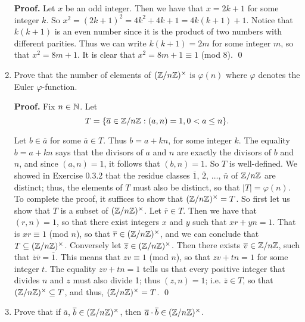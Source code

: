 \begin{enumerate}
      \textbf{Proof.} Let $x$ be an odd integer. Then we have that $x = 2k + 1$
      for some integer $k$. So $x^2 = (2k + 1)^2 = 4k^2 + 4k + 1 =
      4k(k + 1) + 1$. Notice that $k(k + 1)$ is an even number since it is the
      product of two numbers with different parities. Thus we can write
      $k(k + 1) = 2m$ for some integer $m$, so that $x^2 = 8m + 1$. It is clear
      that $x^2 = 8m + 1 \equiv 1$ (mod 8). \qed
   \item[0.3.10]  Prove that the number of elements of $(\mathbb{Z}/n\mathbb{Z})^\times$ is
                  $\varphi(n)$ where $\varphi$ denotes the Euler
                  $\varphi$-function.
                  
      \textbf{Proof.} Fix $n \in \mathbb{N}$. Let
      $$T = \{\overline{a} \in \mathbb{Z}/n\mathbb{Z} : (a, n) = 1, 0 < a \le n\}.$$

      Let $b \in \overline{a}$ for some $\overline{a} \in T$. Thus $b = a + kn$,
      for some integer $k$. The equality $b = a + kn$ says that the divisors of
      $a$ and $n$ are exactly the divisors of $b$ and $n$, and since
      $(a, n) = 1$, it follows that $(b, n) = 1$. So $T$ is well-defined. We
      showed in Exercise 0.3.2 that the residue classes $\overline{1}$,
      $\overline{2}$, $\ldots$, $\overline{n}$ of $\mathbb{Z}/n\mathbb{Z}$ are distinct; thus, 
      the elements of $T$ must also be distinct, so that $|T| = \varphi(n)$. To
      complete the proof, it suffices to show that $(\mathbb{Z}/n\mathbb{Z})^\times = T$. So
      first let us show that $T$ is a subset of $(\mathbb{Z}/n\mathbb{Z})^\times$. Let
      $\overline{r} \in T$. Then we have that $(r, n) = 1$, so that there exist 
      integers $x$ and $y$ such that $xr + yn = 1$. That is
      $xr \equiv 1$ (mod $n$), so that $\overline{r} \in (\mathbb{Z}/n\mathbb{Z})^\times$, and
      we can conclude that $T \subseteq (\mathbb{Z}/n\mathbb{Z})^\times$. Conversely let
      $\overline{z} \in (\mathbb{Z}/n\mathbb{Z})^\times$. Then there exists
      $\overline{v} \in \mathbb{Z}/n\mathbb{Z}$, such that
      $\overline{z}\overline{v} = \overline{1}$. This means that
      $zv \equiv 1$ (mod $n$), so that $zv + tn = 1$ for some integer $t$. The
      equality $zv + tn = 1$ tells us that every positive integer that divides 
      $n$ and $z$ must also divide 1; thus $(z, n) = 1$; i.e.
      $\overline{z} \in T$, so that $(\mathbb{Z}/n\mathbb{Z})^\times \subseteq T$, and thus,
      $(\mathbb{Z}/n\mathbb{Z})^\times = T$. \qed
   \item[0.3.11]  Prove that if $\overline{a}$,
                  $\overline{b} \in (\mathbb{Z}/n\mathbb{Z})^\times$, then
                  $\overline{a} \cdot \overline{b} \in (\mathbb{Z}/n\mathbb{Z})^\times$.


\end{enumerate}
